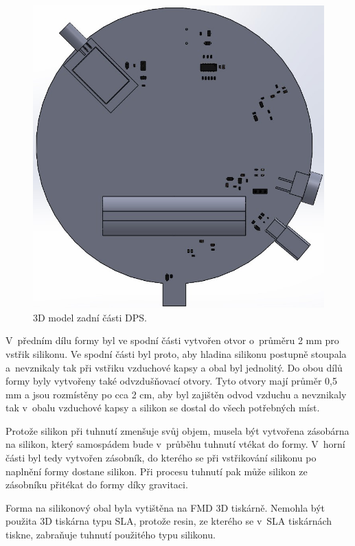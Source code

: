 \begin{figure}[!h]
  \begin{center}
    \includegraphics[scale=0.4]{obrazky/3D_model_zadni.jpg}
  \end{center}
  \caption[3D model zadní části DPS]{3D model zadní části DPS.}
\end{figure}

V~předním dílu formy byl ve spodní části vytvořen otvor o~průměru 2 mm pro vstřik silikonu. Ve spodní části byl proto, aby hladina silikonu postupně stoupala a~nevznikaly tak při vstřiku vzduchové 
kapsy a obal byl jednolitý. Do obou dílů formy byly vytvořeny také odvzdušňovací otvory. Tyto otvory mají průměr 0,5 mm a jsou rozmístěny po cca 2 cm, aby byl zajištěn odvod vzduchu a nevznikaly tak 
v~obalu vzduchové kapsy a silikon se dostal do všech potřebných míst. 

Protože silikon při tuhnutí zmenšuje svůj objem, musela být vytvořena zásobárna na silikon, který samospádem bude v~průběhu tuhnutí vtékat do formy. V~horní části byl tedy vytvořen zásobník, do kterého 
se při vstřikování silikonu po naplnění formy dostane silikon. Při procesu tuhnutí pak může silikon ze zásobníku přitékat do formy díky gravitaci. 

Forma na silikonový obal byla vytištěna na FMD 3D tiskárně. Nemohla být použita 3D tiskárna typu SLA, protože resin, ze kterého se v~SLA tiskárnách tiskne, zabraňuje tuhnutí použitého typu silikonu. 

